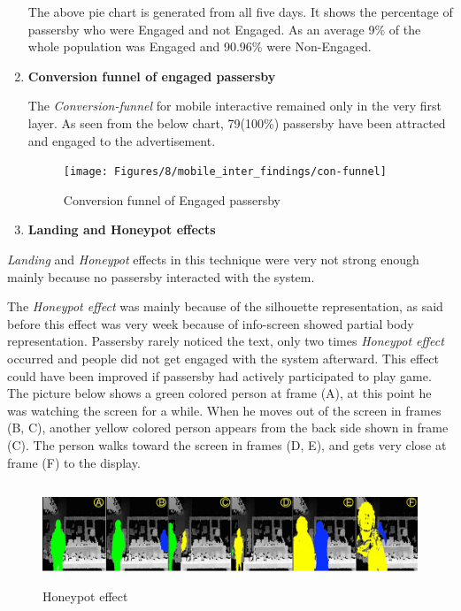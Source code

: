 \begin{enumerate}
The above pie chart is generated from all five days. It shows the percentage of passersby who were Engaged and not Engaged. As an average 9\% of the whole population was Engaged and 90.96\% were Non-Engaged.



\item \textbf{Conversion funnel of engaged passersby}

The \emph{Conversion-funnel} for mobile interactive remained only in the very first layer. As seen from the below chart, 79(100\%) passersby have been attracted and engaged to the advertisement. 

\begin{figure}[H]
    \centering
    \texttt{[image: Figures/8/mobile\_inter\_findings/con-funnel]}
    \caption{Conversion funnel of Engaged passersby}%
    \label{fig:bodyengagedpasserbypercentage}%
\end{figure}



\item \textbf{Landing and Honeypot effects}
\end{enumerate}

\emph{Landing} and \emph{Honeypot} effects in this technique were very not strong enough mainly because no passersby interacted with the system.

The \emph{Honeypot effect} was mainly because of the silhouette representation, as said before this effect was very week because of info-screen showed partial body representation. Passersby rarely noticed the text, only two times \emph{Honeypot effect} occurred and people did not get engaged with the system afterward. This effect could have been improved if passersby had actively participated to play game.  The picture below shows a green colored person at frame (A), at this point he was watching the screen for a while. When he moves out of the screen in frames (B, C), another yellow colored person appears from the back side shown in frame (C). The person walks toward the screen in frames (D, E), and gets very close at frame (F) to the display.

\begin{minipage}{0.95\textwidth}
\begin{flushright}
\begin{figure}[H]
    \centering
    \includegraphics[width=\textwidth,height=30mm]{Figures/8/mobile_inter_findings/effects/honeypot}
    \caption{Honeypot effect}
    \label{fig:mobile_honeypoteffect}
\end{figure}
\end{flushright}
\end{minipage}


